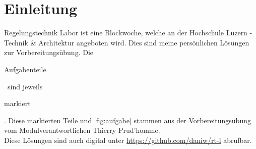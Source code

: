 \section*{Einleitung}
Regelungstechnik Labor ist eine Blockwoche, welche an der Hochschule Luzern - 
Technik \& Architektur angeboten wird. Dies sind meine persönlichen Lösungen 
zur Vorbereitungsübung. Die \begin{aufgabe}Aufgabenteile\end{aufgabe} ~sind 
jeweils \begin{aufgabe}markiert\end{aufgabe}. Diese markierten Teile und 
\autoref{fig:aufgabe} stammen aus der Vorbereitungsübung vom 
Modulverantwortlichen Thierry Prud'homme. \\
Diese Lösungen sind auch digital unter \url{https://github.com/daniw/rt-l} 
abrufbar. 
\\

